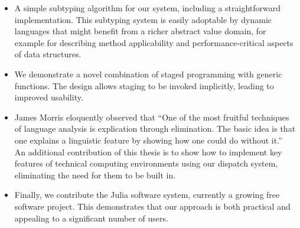 \begin{itemize}

\item A simple subtyping algorithm for our system, including a straightforward
implementation.
This subtyping system is easily adoptable by dynamic languages that might
benefit from a richer abstract value domain, for example for
describing method applicability and performance-critical aspects of data structures.





\item We demonstrate a novel combination of staged programming with generic
functions.
The design allows staging to be invoked implicitly, leading to improved
usability.


\item James Morris eloquently observed that
``One of the most fruitful techniques of language analysis is explication through
elimination.
The basic idea is that one explains a linguistic feature by showing
how one could do without it.''~\cite{morris}
An additional contribution of this thesis is to show how to implement
key features of technical computing environments using our dispatch system,
eliminating the need for them to be built in.



\item Finally, we contribute the Julia software system, currently a
growing free software project.
This demonstrates that our approach is both practical and appealing to a
significant number of users.

\end{itemize}
